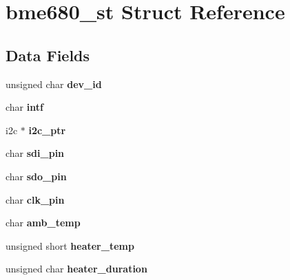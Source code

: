 \hypertarget{structbme680__st}{}\section{bme680\+\_\+st Struct Reference}
\label{structbme680__st}
\subsection*{Data Fields}
\begin{DoxyCompactItemize}
\item 
\mbox{\label{structbme680__st_a86dffc3315c1ff60fef9d5935d906fcf}} 
unsigned char {\bfseries dev\+\_\+id}
\item 
\mbox{\label{structbme680__st_af42aeeb1089ebdb7a245f1bb4b394121}} 
char {\bfseries intf}
\item 
\mbox{\label{structbme680__st_ae8041f186657074b7159c2904e51fbe9}} 
i2c $\ast$ {\bfseries i2c\+\_\+ptr}
\item 
\mbox{\label{structbme680__st_a0c40f848fa7e6d4436fbf627350387d8}} 
char {\bfseries sdi\+\_\+pin}
\item 
\mbox{\label{structbme680__st_a41c8620440ae4ab8669d264870cd24e0}} 
char {\bfseries sdo\+\_\+pin}
\item 
\mbox{\label{structbme680__st_a9a150bc756caf0d82b20a0b2f114fb9c}} 
char {\bfseries clk\+\_\+pin}
\item 
\mbox{\label{structbme680__st_aae6f27de2609bb8c08904e149aa6ff52}} 
char {\bfseries amb\+\_\+temp}
\item 
\mbox{\label{structbme680__st_a5e29ce2bec19b8eb583eeab6153a8110}} 
unsigned short {\bfseries heater\+\_\+temp}
\item 
\mbox{\label{structbme680__st_a44378375ef49fe14b3d6c858d593de57}} 
unsigned char {\bfseries heater\+\_\+duration}
\item 
\mbox{\label{structbme680__st_a90366bdf869bebb0aa5c299741efb502}} 

\end{DoxyCompactItemize}
